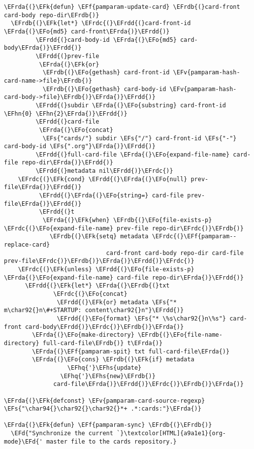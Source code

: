 \documentclass[a4wide,10pt]{article}
\newcommand{\EFs}[1]{\textcolor{EFs}{#1}} %
\newcommand{\EFd}[1]{\textcolor{EFd}{#1}} %
\newcommand{\EFk}[1]{\textcolor{EFk}{#1}} %
\newcommand{\EFf}[1]{\textcolor{EFf}{#1}} %
\newcommand{\EFv}[1]{\textcolor{EFv}{#1}} %
\newcommand{\EFo}[1]{\textcolor{EFo}{#1}} %
\newcommand{\EFhn}[1]{\textcolor{EFhn}{\textbf{#1}}} %
\newcommand{\EFhq}[1]{\textcolor{EFhq}{#1}} %
\newcommand{\EFhs}[1]{\textcolor{EFhs}{#1}} %
\newcommand{\EFrda}[1]{\textcolor{EFrda}{#1}} %
\newcommand{\EFrdb}[1]{\textcolor{EFrdb}{#1}} %
\newcommand{\EFrdc}[1]{\textcolor{EFrdc}{#1}} %
\newcommand{\EFrdd}[1]{\textcolor{EFrdd}{#1}} %
\begin{document}
\begin{Code}
\begin{Verbatim}
\EFrda{(}\EFk{defun} \EFf{pamparam-update-card} \EFrdb{(}card-front card-body repo-dir\EFrdb{)}
  \EFrdb{(}\EFk{let*} \EFrdc{(}\EFrdd{(}card-front-id \EFrda{(}\EFo{md5} card-front\EFrda{)}\EFrdd{)}
         \EFrdd{(}card-body-id \EFrda{(}\EFo{md5} card-body\EFrda{)}\EFrdd{)}
         \EFrdd{(}prev-file
          \EFrda{(}\EFk{or}
           \EFrdb{(}\EFo{gethash} card-front-id \EFv{pamparam-hash-card-name->file}\EFrdb{)}
           \EFrdb{(}\EFo{gethash} card-body-id \EFv{pamparam-hash-card-body->file}\EFrdb{)}\EFrda{)}\EFrdd{)}
         \EFrdd{(}subdir \EFrda{(}\EFo{substring} card-front-id \EFhn{0} \EFhn{2}\EFrda{)}\EFrdd{)}
         \EFrdd{(}card-file
          \EFrda{(}\EFo{concat}
           \EFs{"cards/"} subdir \EFs{"/"} card-front-id \EFs{"-"} card-body-id \EFs{".org"}\EFrda{)}\EFrdd{)}
         \EFrdd{(}full-card-file \EFrda{(}\EFo{expand-file-name} card-file repo-dir\EFrda{)}\EFrdd{)}
         \EFrdd{(}metadata nil\EFrdd{)}\EFrdc{)}
    \EFrdc{(}\EFk{cond} \EFrdd{(}\EFrda{(}\EFo{null} prev-file\EFrda{)}\EFrdd{)}
          \EFrdd{(}\EFrda{(}\EFo{string=} card-file prev-file\EFrda{)}\EFrdd{)}
          \EFrdd{(}t
           \EFrda{(}\EFk{when} \EFrdb{(}\EFo{file-exists-p} \EFrdc{(}\EFo{expand-file-name} prev-file repo-dir\EFrdc{)}\EFrdb{)}
             \EFrdb{(}\EFk{setq} metadata \EFrdc{(}\EFf{pamparam--replace-card}
                             card-front card-body repo-dir card-file prev-file\EFrdc{)}\EFrdb{)}\EFrda{)}\EFrdd{)}\EFrdc{)}
    \EFrdc{(}\EFk{unless} \EFrdd{(}\EFo{file-exists-p} \EFrda{(}\EFo{expand-file-name} card-file repo-dir\EFrda{)}\EFrdd{)}
      \EFrdd{(}\EFk{let*} \EFrda{(}\EFrdb{(}txt
              \EFrdc{(}\EFo{concat}
               \EFrdd{(}\EFk{or} metadata \EFs{"* m\char92{}n\#+STARTUP: content\char92{}n"}\EFrdd{)}
               \EFrdd{(}\EFo{format} \EFs{"* \%s\char92{}n\%s"} card-front card-body\EFrdd{)}\EFrdc{)}\EFrdb{)}\EFrda{)}
        \EFrda{(}\EFo{make-directory} \EFrdb{(}\EFo{file-name-directory} full-card-file\EFrdb{)} t\EFrda{)}
        \EFrda{(}\EFf{pamparam-spit} txt full-card-file\EFrda{)}
        \EFrda{(}\EFo{cons} \EFrdb{(}\EFk{if} metadata
                  \EFhq{'}\EFhs{update}
                \EFhq{'}\EFhs{new}\EFrdb{)}
              card-file\EFrda{)}\EFrdd{)}\EFrdc{)}\EFrdb{)}\EFrda{)}

\EFrda{(}\EFk{defconst} \EFv{pamparam-card-source-regexp} \EFs{"\char94{}\char92{}\char92{}*+ .*:cards:"}\EFrda{)}

\EFrda{(}\EFk{defun} \EFf{pamparam-sync} \EFrdb{(}\EFrdb{)}
  \EFd{"Synchronize the current `}\textcolor[HTML]{a9a1e1}{org-mode}\EFd{' master file to the cards repository.}


\end{Verbatim}
\end{Code}
\end{document}
